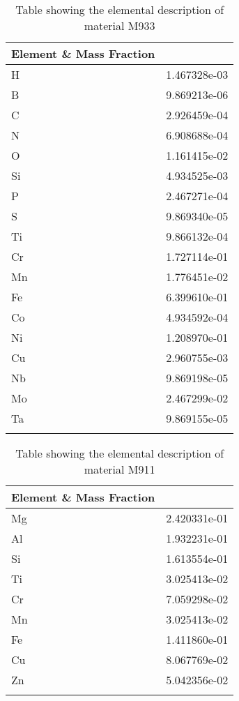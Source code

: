 \begin{centering}
\begin{longtable}[ht!]
{ p{} | p{} }
\hline
Element \& Mass Fraction\\
\hline
H &  1.467328e-03\\
B &  9.869213e-06\\
C &  2.926459e-04\\
N &  6.908688e-04\\
O &  1.161415e-02\\
Si &  4.934525e-03\\
P &  2.467271e-04\\
S &  9.869340e-05\\
Ti &  9.866132e-04\\
Cr &  1.727114e-01\\
Mn &  1.776451e-02\\
Fe &  6.399610e-01\\
Co &  4.934592e-04\\
Ni &  1.208970e-01\\
Cu &  2.960755e-03\\
Nb &  9.869198e-05\\
Mo &  2.467299e-02\\
Ta &  9.869155e-05\\
\caption{Table showing the elemental description of material M933}
\label{table:material_UPTRAP}
\end{longtable}
\clearpage

\begin{longtable}[ht!]
  { p{} | p{} }
\hline
Element \& Mass Fraction\\
\hline
Mg &  2.420331e-01\\
Al &  1.932231e-01\\
Si &  1.613554e-01\\
Ti &  3.025413e-02\\
Cr &  7.059298e-02\\
Mn &  3.025413e-02\\
Fe &  1.411860e-01\\
Cu &  8.067769e-02\\
Zn &  5.042356e-02\\
\caption{Table showing the elemental description of material M911}
\label{table:material_EppExFrames}
\end{longtable}
\clearpage


\end{centering}

